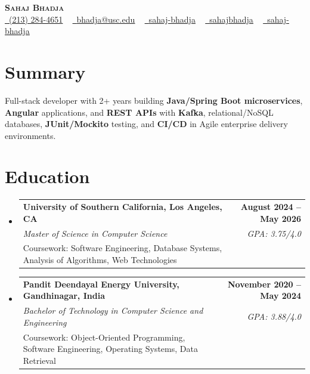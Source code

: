 \documentclass[letterpaper,10pt]{article}
\makeatletter
\newcommand{\resumeEduSubheading}[5]{\vspace{-1pt}\item\begin{tabular*}{1.0\textwidth}[t]{l@{\extracolsep{\fill}}r}\textbf{#1} & \textbf{\small #2} \\\textit{\small #3} & \textit{\small #4} \\\small #5 & \\\end{tabular*}\vspace{-4pt}}
\newcommand{\resumeSubHeadingListStart}{\begin{itemize}[leftmargin=0.0in, label={}]}
\newcommand{\resumeSubHeadingListEnd}{\end{itemize}}
\makeatother
\begin{document}
\begin{center}
{\Huge \scshape \textbf{Sahaj Bhadja}} \\ \vspace{1pt}
\small \href{tel:(213) 284-4651}{\faPhone\ \underline{(213) 284-4651}} ~ \href{mailto:bhadja@usc.edu}{\raisebox{-0.2\height}\faEnvelope\ \underline{bhadja@usc.edu}} ~
\href{https://www.linkedin.com/in/sahaj-bhadja/}{\raisebox{-0.2\height}\faLinkedin\ \underline{sahaj-bhadja}} ~ \href{https://github.com/SAHAJ-BHADJA}{\raisebox{-0.2\height}\faGithub\ \underline{sahajbhadja}} ~
\href{https://sahaj-bhadja.vercel.app/}{\raisebox{-0.2\height}\faGlobe\ \underline{sahaj-bhadja}}
\end{center}
\vspace{-18pt}
\section{Summary}
\begin{itemize}[leftmargin=0.15in, label={}]
\small{\item{Full-stack developer with 2+ years building \textbf{Java/Spring Boot microservices}, \textbf{Angular} applications, and \textbf{REST APIs} with \textbf{Kafka}, relational/NoSQL databases, \textbf{JUnit/Mockito} testing, and \textbf{CI/CD} in Agile enterprise delivery environments.}}
\end{itemize}
\vspace{-16pt}
\section{Education}
\resumeSubHeadingListStart
\resumeEduSubheading{University of Southern California, Los Angeles, CA}{August 2024 -- May 2026}{Master of Science in Computer Science}{GPA: 3.75/4.0}{Coursework: Software Engineering, Database Systems, Analysis of Algorithms, Web Technologies}
\vspace{-9pt}
\resumeEduSubheading{Pandit Deendayal Energy University, Gandhinagar, India}{November 2020 -- May 2024}{Bachelor of Technology in Computer Science and Engineering}{GPA: 3.88/4.0}{Coursework: Object-Oriented Programming, Software Engineering, Operating Systems, Data Retrieval}
\resumeSubHeadingListEnd
\vspace{-14pt}
\end{document}
